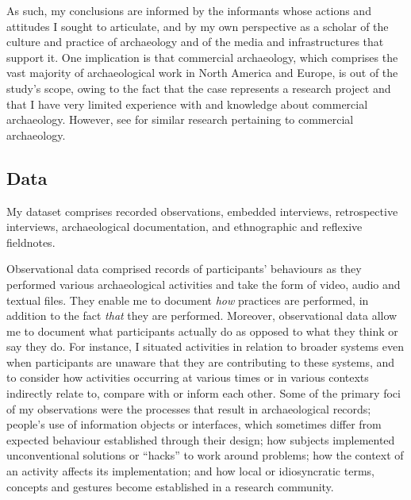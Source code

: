 As such, my conclusions are informed by the informants whose actions and attitudes I sought to articulate, and by my own perspective as a scholar of the culture and practice of archaeology and of the media and infrastructures that support it.
One implication is that commercial archaeology, which comprises the vast majority of archaeological work in North America and Europe, is out of the study's scope, owing to the fact that the case represents a research project and that I have very limited experience with and knowledge about commercial archaeology.
However, see \textcites[]{chadwick1998}[]{thorpe2012}[]{zorzin2015} for similar research pertaining to commercial archaeology.

\subsection*{Data}
My dataset comprises recorded observations, embedded interviews, retrospective interviews, archaeological documentation, and ethnographic and reflexive fieldnotes.

Observational data comprised records of participants' behaviours as they performed various archaeological activities and take the form of video, audio and textual files.
They enable me to document \emph{how} practices are performed, in addition to the fact \emph{that} they are performed.
Moreover, observational data allow me to document what participants actually do as opposed to what they think or say they do.
For instance, I situated activities in relation to broader systems even when participants are unaware that they are contributing to these systems, and to consider how activities occurring at various times or in various contexts indirectly relate to, compare with or inform each other.
Some of the primary foci of my observations were the processes that result in archaeological records; people's use of information objects or interfaces, which sometimes differ from expected behaviour established through their design; how subjects implemented unconventional solutions or ``hacks'' to work around problems; how the context of an activity affects its implementation; and how local or idiosyncratic terms, concepts and gestures become established in a research community.

